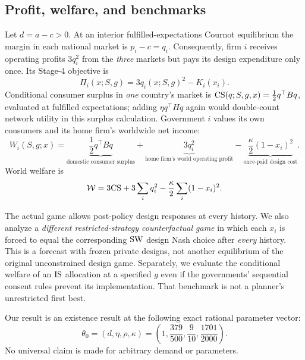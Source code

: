 \subsection{Profit, welfare, and benchmarks}

Let $d=a-c>0$. At an interior fulfilled-expectations Cournot
equilibrium the margin in each national market is $p_i-c=q_i$.
Consequently, firm $i$ receives operating profits $3q_i^2$
from the \emph{three} markets but pays its design expenditure only
once. Its Stage-4 objective is
\begin{equation}\label{eq:pi}
 \Pi_i(x;S,g)=3q_i(x;S,g)^2-K_i(x_i).
\end{equation}
Conditional consumer surplus in \emph{one} country's market is
$\mathrm{CS}(q;S,g,x)=\tfrac12q^\top Bq$, evaluated at fulfilled
expectations; adding $\eta q^\top Hq$ again would double-count
network utility in this surplus calculation. Government $i$
values its own consumers and its home firm's worldwide net income:
\begin{equation}\label{eq:welfare}
 W_i(S,g;x)=
 \underbrace{\frac12q^\top Bq}_{\text{domestic consumer surplus}}
 +\underbrace{3q_i^2}_{\text{home firm's world operating profit}}
 -\underbrace{\frac{\kappa}{2}(1-x_i)^2}_{\text{once-paid design cost}}.
\end{equation}
World welfare is
\begin{equation}\label{eq:world}
 {\cal W}=3\mathrm{CS}+3\sum_i q_i^2
                       -\frac{\kappa}{2}\sum_i(1-x_i)^2.
\end{equation}

The actual game allows post-policy design responses at every
history. We also analyze a \emph{different restricted-strategy
counterfactual game} in which each $x_i$ is forced to equal the
corresponding $\mathrm{SW}$ design Nash choice after \emph{every} history.
This is a forecast with frozen private designs, not another
equilibrium of the original unconstrained design game. Separately,
we evaluate the conditional welfare of an $\mathrm{IS}$ allocation at a
specified $g$ even if the governments' sequential consent rules
prevent its implementation. That benchmark is not a planner's
unrestricted first best.

Our result is an existence result at the following exact rational
parameter vector:
\begin{equation}\label{eq:witness}
 \theta_0=(d,\eta,\rho,\kappa)
 =\left(1,\frac{379}{500},\frac9{10},\frac{1701}{2000}\right).
\end{equation}
No universal claim is made for arbitrary demand or parameters.
